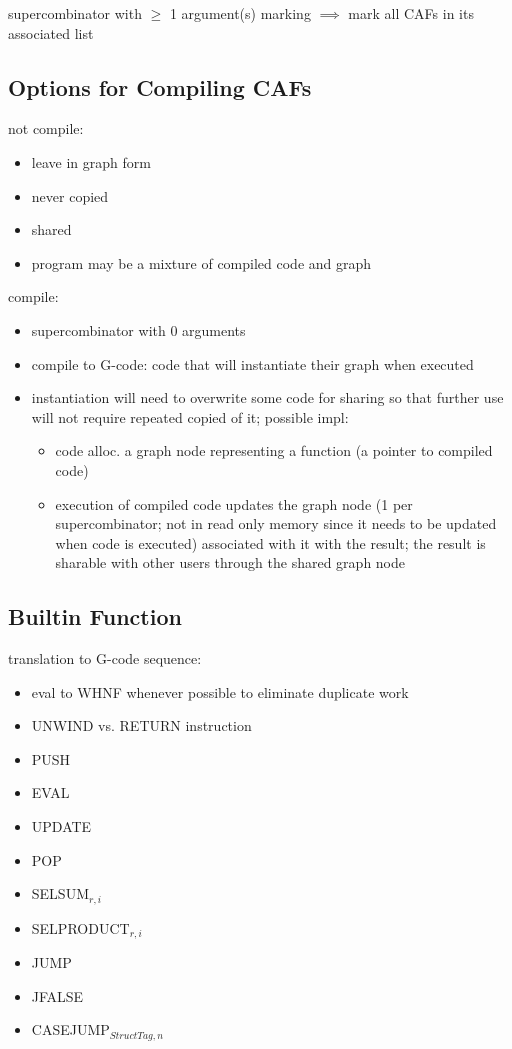 \documentclass[8pt]{extarticle}
\begin{document}
\begin{multicols*}{2}
supercombinator with $\geq$ 1 argument(s) marking $\implies$ mark all CAFs in its associated list

\subsection{Options for Compiling CAFs}
not compile:
\begin{itemize}
\item leave in graph form
\item never copied
\item shared
\item program may be a mixture of compiled code and graph
\end{itemize}

compile:
\begin{itemize}
\item supercombinator with 0 arguments
\item compile to G-code: code that will instantiate their graph when executed
\item instantiation will need to overwrite some code for sharing so that further use will not require repeated copied of it; possible impl:
  \begin{itemize}
  \item code alloc. a graph node representing a function (a pointer to compiled code)
  \item execution of compiled code updates the graph node (1 per supercombinator; not in read only memory since it needs to be updated when code is executed) associated with it with the result; the result is sharable with other users through the shared graph node
  \end{itemize}
\end{itemize}

\subsection{Builtin Function}

translation to G-code sequence:
\begin{itemize}
\item eval to WHNF whenever possible to eliminate duplicate work
\item UNWIND vs. RETURN instruction
\item PUSH
\item EVAL
\item UPDATE
\item POP
\item SELSUM$_{r,i}$
\item SELPRODUCT$_{r,i}$
\item JUMP
\item JFALSE
\item CASEJUMP$_{StructTag, n}$
\end{itemize}


\end{multicols*}
\end{document}
